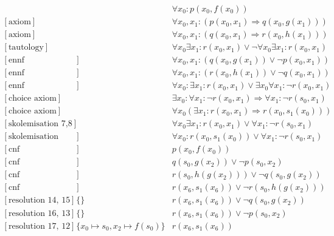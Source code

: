 \documentclass[onehalfspacing]{article}
\begin{document}
\setcounter{equation}{0}
\begin{align}
	[\text{axiom}] && \forall x_0: p(x_0,f(x_0))\\
	[\text{axiom}] && \forall x_0, x_1 : (p(x_0,x_1) \Rightarrow q(x_0,g(x_1)))\\
	[\text{axiom}] && \forall x_0, x_1 : (q(x_0,x_1) \Rightarrow r(x_0,h(x_1)))\\
	[\text{tautology}] &&\forall  x_0 \exists x_1 : r(x_0,x_1)\vee \neg\forall  x_0 \exists x_1 : r(x_0,x_1)\\
	[\text{ennf transformation 2}] && \forall x_0, x_1 : (q(x_0,g(x_1)) \vee \neg p(x_0,x_1)) \\
	[\text{ennf transformation 3}] &&\forall x_0, x_1 : (r(x_0,h(x_1)) \vee \neg q(x_0, x_1)) \\
	[\text{ennf transformation 4}] && \forall  x_0 : \exists x_1 : r(x_0,x_1)\vee \exists x_0 \forall x_1 : \neg r(x_0, x_1)\\
	[\text{choice axiom}] && \exists x_0 : \forall x_1 : \neg r(x_0, x_1) \Rightarrow \forall x_1 : \neg r(s_0,x_1)\\
	[\text{choice axiom}] &&\forall x_0(\exists x_1: r(x_0, x_1)\Rightarrow r(x_0, s_1(x_0)))\\
	[\text{skolemisation 7,8}] && \forall  x_0 \exists x_1 : r(x_0,x_1)\vee \forall x_1 : \neg r(s_0, x_1)\\
	[\text{skolemisation 9,10}] && \forall  x_0 :  r(x_0, s_1(x_0))\vee \forall x_1 : \neg r(s_0, x_1)\\
	[\text{cnf transformation 1}] && p(x_0,f(x_0))\\
	[\text{cnf transformation 5}] && q(s_0,g(x_2)) \vee \neg p(s_0, x_2)\\
	[\text{cnf transformation 6}] && r(s_0,h(g(x_2))) \vee \neg q(s_0, g(x_2))\\
	[\text{cnf transformation 11}] && r(x_6, s_1(x_6))\vee\neg r(s_0,h(g(x_2)))\\
	[\text{resolution 14, 15}] &\{\}&r(x_6, s_1(x_6))\vee\neg q(s_0,g(x_2))\\
	[\text{resolution 16, 13}] &\{\}&r(x_6, s_1(x_6))\vee\neg p(s_0,x_2)\\
	[\text{resolution 17, 12}] &\{x_0\mapsto s_0, x_2\mapsto f(s_0)\}&r(x_6, s_1(x_6))
\end{align}
\end{document}
